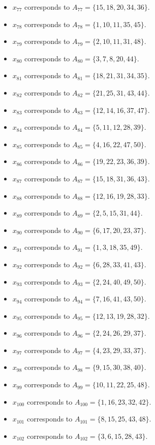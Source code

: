 \documentclass[11pt]{article}
\begin{document}
\begin{itemize}
\item $x_{77}$ corresponds to $A_{77}=\{15, 18, 20, 34, 36\}$.
\item $x_{78}$ corresponds to $A_{78}=\{1, 10, 11, 35, 45\}$.
\item $x_{79}$ corresponds to $A_{79}=\{2, 10, 11, 31, 48\}$.
\item $x_{80}$ corresponds to $A_{80}=\{3, 7, 8, 20, 44\}$.
\item $x_{81}$ corresponds to $A_{81}=\{18, 21, 31, 34, 35\}$.
\item $x_{82}$ corresponds to $A_{82}=\{21, 25, 31, 43, 44\}$.
\item $x_{83}$ corresponds to $A_{83}=\{12, 14, 16, 37, 47\}$.
\item $x_{84}$ corresponds to $A_{84}=\{5, 11, 12, 28, 39\}$.
\item $x_{85}$ corresponds to $A_{85}=\{4, 16, 22, 47, 50\}$.
\item $x_{86}$ corresponds to $A_{86}=\{19, 22, 23, 36, 39\}$.
\item $x_{87}$ corresponds to $A_{87}=\{15, 18, 31, 36, 43\}$.
\item $x_{88}$ corresponds to $A_{88}=\{12, 16, 19, 28, 33\}$.
\item $x_{89}$ corresponds to $A_{89}=\{2, 5, 15, 31, 44\}$.
\item $x_{90}$ corresponds to $A_{90}=\{6, 17, 20, 23, 37\}$.
\item $x_{91}$ corresponds to $A_{91}=\{1, 3, 18, 35, 49\}$.
\item $x_{92}$ corresponds to $A_{92}=\{6, 28, 33, 41, 43\}$.
\item $x_{93}$ corresponds to $A_{93}=\{2, 24, 40, 49, 50\}$.
\item $x_{94}$ corresponds to $A_{94}=\{7, 16, 41, 43, 50\}$.
\item $x_{95}$ corresponds to $A_{95}=\{12, 13, 19, 28, 32\}$.
\item $x_{96}$ corresponds to $A_{96}=\{2, 24, 26, 29, 37\}$.
\item $x_{97}$ corresponds to $A_{97}=\{4, 23, 29, 33, 37\}$.
\item $x_{98}$ corresponds to $A_{98}=\{9, 15, 30, 38, 40\}$.
\item $x_{99}$ corresponds to $A_{99}=\{10, 11, 22, 25, 48\}$.
\item $x_{100}$ corresponds to $A_{100}=\{1, 16, 23, 32, 42\}$.
\item $x_{101}$ corresponds to $A_{101}=\{8, 15, 25, 43, 48\}$.
\item $x_{102}$ corresponds to $A_{102}=\{3, 6, 15, 28, 43\}$.

\end{itemize}
\end{document}
